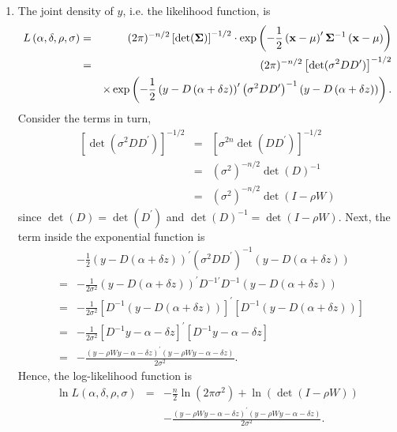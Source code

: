 \begin{Solution}{12.14}
\begin{enumerate}
\item The joint density of $y$, i.e. the likelihood function, is%
\begin{eqnarray*}
L\left( \alpha ,\delta ,\rho ,\sigma \right)  &=&(2\pi )^{-n/2}\left[ \det (%
\mathbf{\Sigma })\right] ^{-1/2}\cdot \exp \left( -\frac{1}{2}\left( \mathbf{%
x}-\mathbf{\mu }\right) ^{\prime }\mathbf{\Sigma }^{-1}\left( \mathbf{x}-%
\mathbf{\mu }\right) \right)  \\
&=&(2\pi )^{-n/2}\left[ \det (\sigma ^{2}DD^{\prime })\right] ^{-1/2} \\
&&\times \exp \left( -\frac{1}{2}\left( y-D\left( \alpha +\delta z\right)
\right) ^{\prime }\left( \sigma ^{2}DD^{\prime }\right) ^{-1}\left(
y-D\left( \alpha +\delta z\right) \right) \right) .
\end{eqnarray*}%
Consider the terms in turn,%
\begin{eqnarray*}
\left[ \det (\sigma ^{2}DD^{\prime })\right] ^{-1/2} &=&\left[ \sigma
^{2n}\det \left( DD^{\prime }\right) \right] ^{-1/2} \\
&=&\left( \sigma ^{2}\right) ^{-n/2}\det \left( D\right) ^{-1} \\
&=&\left( \sigma ^{2}\right) ^{-n/2}\det (I-\rho W)
\end{eqnarray*}%
since $\det (D)=\det (D^{\prime })$ and $\det (D)^{-1}=\det (I-\rho W)$.
Next, the term inside the exponential function is%
\begin{eqnarray*}
&&-\frac{1}{2}\left( y-D\left( \alpha +\delta z\right) \right) ^{\prime
}\left( \sigma ^{2}DD^{\prime }\right) ^{-1}\left( y-D\left( \alpha +\delta
z\right) \right)  \\
&=&-\frac{1}{2\sigma ^{2}}\left( y-D\left( \alpha +\delta z\right) \right)
^{\prime }D^{-1\prime }D^{-1}\left( y-D\left( \alpha +\delta z\right)
\right)  \\
&=&-\frac{1}{2\sigma ^{2}}\left[ D^{-1}\left( y-D\left( \alpha +\delta
z\right) \right) \right] ^{\prime }\left[ D^{-1}\left( y-D\left( \alpha
+\delta z\right) \right) \right]  \\
&=&-\frac{1}{2\sigma ^{2}}\left[ D^{-1}y-\alpha -\delta z\right] ^{\prime }%
\left[ D^{-1}y-\alpha -\delta z\right]  \\
&=&-\frac{\left( y-\rho Wy-\alpha -\delta z\right) ^{\prime }\left( y-\rho
Wy-\alpha -\delta z\right) }{2\sigma ^{2}}.
\end{eqnarray*}%
Hence, the log-likelihood function is%
\begin{eqnarray*}
\ln L\left( \alpha ,\delta ,\rho ,\sigma \right)  &=&-\frac{n}{2}\ln \left(
2\pi \sigma ^{2}\right) +\ln \left( \det \left( I-\rho W\right) \right)  \\
&&-\frac{\left( y-\rho Wy-\alpha -\delta z\right) ^{\prime }\left( y-\rho
Wy-\alpha -\delta z\right) }{2\sigma ^{2}}.
\end{eqnarray*}


\end{enumerate}
\end{Solution}
